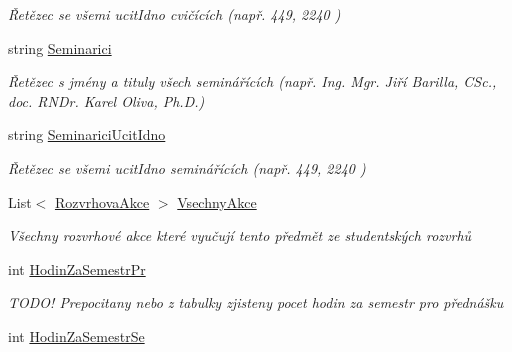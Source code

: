 \begin{DoxyCompactItemize}
\begin{DoxyCompactList}\small\item\em Řetězec se všemi ucit\+Idno cvičících (např. 449, 2240 ) \end{DoxyCompactList}\item 
string \hyperlink{class_analyza_rozvrhu_1_1_s_t_a_g___classes_1_1_predmet_a128ceaabeec299261cd09b6a2921d90b}{Seminarici}
\begin{DoxyCompactList}\small\item\em Řetězec s jmény a tituly všech seminářících (např. \textquotesingle{}Ing. Mgr. Jiří Barilla, C\+Sc.\textquotesingle{}, \textquotesingle{}doc. R\+N\+Dr. Karel Oliva, Ph.\+D.\textquotesingle{}) \end{DoxyCompactList}\item 
string \hyperlink{class_analyza_rozvrhu_1_1_s_t_a_g___classes_1_1_predmet_a893040d3db5a777234b5a175efdaa61c}{Seminarici\+Ucit\+Idno}
\begin{DoxyCompactList}\small\item\em Řetězec se všemi ucit\+Idno seminářících (např. 449, 2240 ) \end{DoxyCompactList}\item 
List$<$ \hyperlink{class_analyza_rozvrhu_1_1_s_t_a_g___classes_1_1_rozvrhova_akce}{Rozvrhova\+Akce} $>$ \hyperlink{class_analyza_rozvrhu_1_1_s_t_a_g___classes_1_1_predmet_a2ee96fae2d567cd70cd44b27d6a70ae5}{Vsechny\+Akce}
\begin{DoxyCompactList}\small\item\em Všechny rozvrhové akce které vyučují tento předmět ze studentských rozvrhů \end{DoxyCompactList}\item 
int \hyperlink{class_analyza_rozvrhu_1_1_s_t_a_g___classes_1_1_predmet_ad8cc821699c02f05249c64479777ac50}{Hodin\+Za\+Semestr\+Pr}
\begin{DoxyCompactList}\small\item\em T\+O\+D\+O! Prepocitany nebo z tabulky zjisteny pocet hodin za semestr pro přednášku \end{DoxyCompactList}\item 
int \hyperlink{class_analyza_rozvrhu_1_1_s_t_a_g___classes_1_1_predmet_a3d8c4c19f99213a2e16fc63082a97b31}{Hodin\+Za\+Semestr\+Se}

\end{DoxyCompactItemize}
